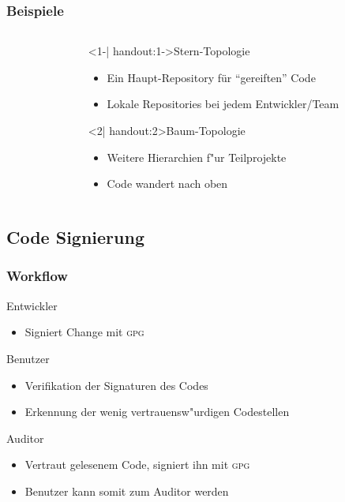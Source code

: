 \documentclass[german, presentation]{beamer}
\newcommand{\GPG}{\textsc{gpg}}
\begin{document}
\begin{frame}
  \frametitle{Beispiele}
  \begin{columns}
    \begin{column}{0.5\textwidth}
      \begin{flushleft}
      \end{flushleft}
    \end{column}
    \begin{column}{0.5\textwidth}
      \begin{block}<1-| handout:1->{Stern-Topologie}
        \begin{itemize}
        \item Ein Haupt-Repository f\"ur "`gereiften"' Code
        \item Lokale Repositories bei jedem Entwickler/Team
        \end{itemize}
      \end{block}
      \begin{block}<2| handout:2>{Baum-Topologie}
        \begin{itemize}
        \item Weitere Hierarchien f"ur Teilprojekte
        \item Code wandert nach oben
        \end{itemize}
      \end{block}
    \end{column}
  \end{columns}
\end{frame}

\subsection{Code Signierung}

\begin{frame}
  \frametitle{Workflow}
  \begin{block}{Entwickler}
    \begin{itemize}
      \item Signiert Change mit \GPG
    \end{itemize}
  \end{block}
  \begin{block}{Benutzer}
    \begin{itemize}
      \item Verifikation der Signaturen des Codes
      \item Erkennung der wenig vertrauensw"urdigen Codestellen
    \end{itemize}
  \end{block}
  \begin{block}{Auditor}
    \begin{itemize}
      \item Vertraut gelesenem Code, signiert ihn mit \GPG{}
      \item Benutzer kann somit zum Auditor werden
    \end{itemize}
  \end{block}
\end{frame}
\end{document}

